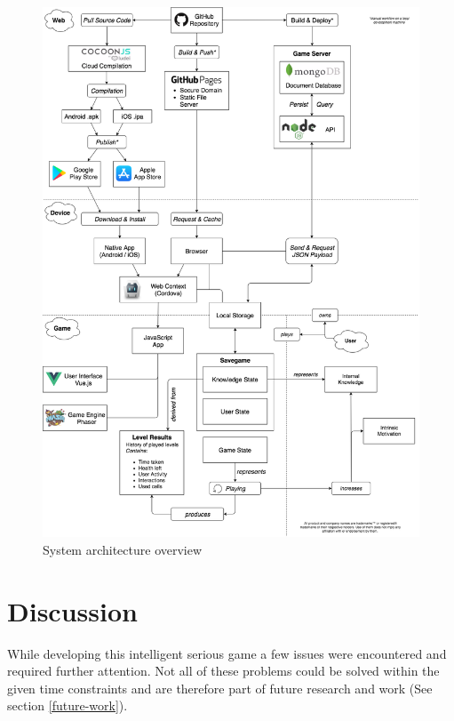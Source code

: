 \begin{figure}
  \includegraphics[width=15cm,keepaspectratio]{assets/architecture.png}
  \caption{System architecture overview}
  \label{fig_system_architecture}
\end{figure}

\clearpage

\section{Discussion} \label{discussion}
While developing this intelligent serious game a few issues were encountered and required further attention. Not all of these problems could be solved within the given time constraints and are therefore part of future research and work (See section \ref{future-work}).

